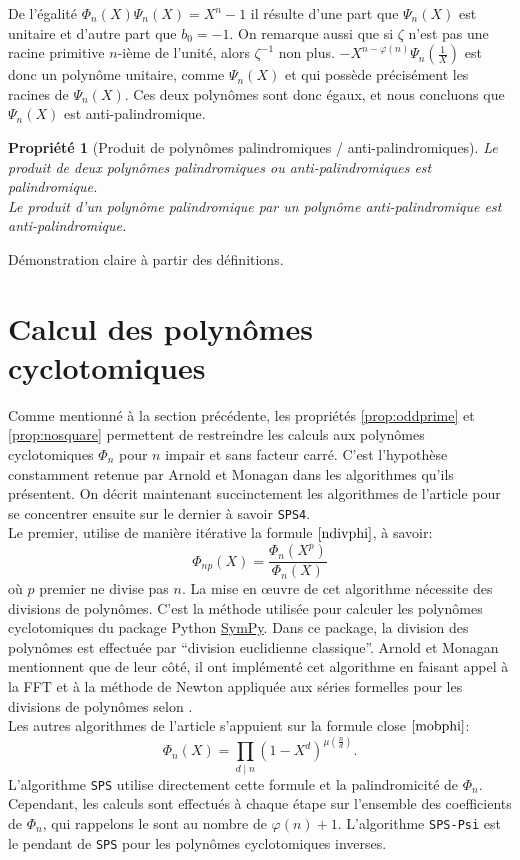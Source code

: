 \documentclass{article}
\theoremstyle{break}                  %
\newtheorem{propriete}{Propriété}
\begin{document}
De l'égalité $\Phi_n(X)\Psi_n(X) = X^n-1$ il résulte d'une part que $\Psi_n(X)$ est unitaire et d'autre part que $b_0=-1$. On remarque aussi que si $\zeta$ n'est pas une racine primitive $n$-ième de l'unité, alors $\zeta^{-1}$ non plus. $-X^{n-\varphi(n)} \Psi_n(\frac{1}{X})$ est donc un polynôme unitaire, comme $\Psi_{n}(X)$ et qui possède précisément les racines de $\Psi_{n}(X)$. Ces deux polynômes sont donc égaux, et nous concluons que $\Psi_{n}(X)$ est anti-palindromique.


\begin{propriete}[Produit de polynômes palindromiques / anti-palindromiques]
	Le produit de deux polynômes palindromiques ou anti-palindromiques est palindromique.\\
	Le produit d'un polynôme palindromique par un polynôme anti-palindromique est anti-palindromique.
\end{propriete}
Démonstration claire à partir des définitions. 

\section*{Calcul des polynômes cyclotomiques}
Comme mentionné à la section précédente, les propriétés \ref{prop:oddprime} et \ref{prop:nosquare} permettent de restreindre les calculs aux polynômes cyclotomiques $\Phi_n$ pour $n$ impair et sans facteur carré. C'est l'hypothèse constamment retenue par Arnold et Monagan dans les algorithmes qu'ils présentent. On décrit maintenant succinctement les algorithmes de l'article pour se concentrer ensuite sur le dernier à savoir \texttt{SPS4}.\\

Le premier, utilise de manière itérative la formule $\ref{ndivphi}$, à savoir:
$$\Phi_{np}(X) = \frac{\Phi_n(X^p)}{\Phi_n(X)}$$ où $p$ premier ne divise pas $n$. La mise en œuvre de cet algorithme nécessite des divisions de polynômes. C'est la méthode utilisée pour calculer les polynômes cyclotomiques du package Python \href{https://docs.sympy.org/latest/index.html}{SymPy}. Dans ce package, la division des polynômes est effectuée par \enquote{division euclidienne classique}. Arnold et Monagan mentionnent que de leur côté, il ont implémenté cet algorithme en faisant appel à la FFT et à la méthode de Newton appliquée aux séries formelles pour les divisions de polynômes selon \cite{algocomputalg}.\\

Les autres algorithmes de l'article s'appuient sur la formule close $\ref{mobphi}$:
$$\Phi_n(X) =  \prod_{d \mid n} (1 - X^d)^{\mu(\frac{n}{d})}.$$
L'algorithme \texttt{SPS} utilise directement cette formule et la palindromicité de $\Phi_n$. Cependant, les calculs sont effectués à chaque étape sur l'ensemble des coefficients de $\Phi_n$, qui rappelons le sont au nombre de $\varphi(n)+1$. L'algorithme \texttt{SPS-Psi} est le pendant de \texttt{SPS} pour les polynômes cyclotomiques inverses.\\
\end{document}
